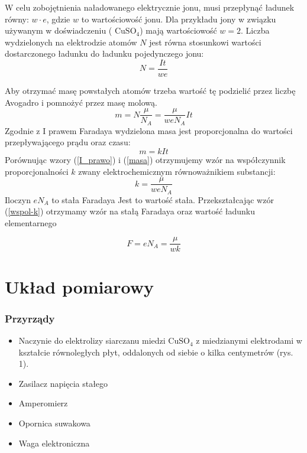 \documentclass [a4paper,11pt]{article}
\begin{document}
W celu zobojętnienia naładowanego elektrycznie jonu, musi przepłynąć ładunek równy: $ w \cdot e$, gdzie $w$ to wartościowość jonu. 
 Dla przykładu jony w związku używanym w doświadczeniu ( $\text{CuSO}_4$) mają wartościowość $w = 2$. 
Liczba wydzielonych na elektrodzie atomów $N$ jest równa stosunkowi wartości dostarczonego ładunku do ładunku pojedynczego jonu:
\begin{equation}
N = \frac{I t}{w e}
\end{equation}

Aby otrzymać masę powstałych atomów trzeba wartość tę podzielić przez liczbę Avogadro i pomnożyć przez masę molową.
\begin{equation}
m = N \frac{\mu}{N_A} = \frac{\mu}{ w e N_A} It
\label{masa}
\end{equation}
Zgodnie z I prawem Faradaya wydzielona masa jest proporcjonalna do wartości przepływającego prądu oraz czasu:
\begin{equation}
m = k I t
\label{I_prawo}
\end{equation}
Porównując wzory (\ref{I_prawo}) i (\ref{masa}) otrzymujemy wzór na współczynnik proporcjonalności $k$ zwany elektrochemicznym równoważnikiem substancji:
\begin{equation}
k = \frac{\mu}{w e  N_A}
\label{wspol-k}
\end{equation}
 Iloczyn $e N_A$ to stała Faradaya Jest to wartość stała. Przekształcając wzór (\ref{wspol-k}) otrzymamy wzór na stałą Faradaya oraz wartość ładunku elementarnego
 
  \begin{equation}
  F = e N_A =  \frac{\mu}{w k} 
  \label{stala_Faradaya_wzór}
  \end{equation}
 

\section{Układ pomiarowy}


\subsubsection*{Przyrządy}
\begin{itemize}
\item Naczynie do elektrolizy siarczanu miedzi $\text{CuSO}_4$ z miedzianymi elektrodami w kształcie
równoległych płyt, oddalonych od siebie o kilka centymetrów (rys. 1).
\item Zasilacz napięcia stałego
\item Amperomierz
\item Opornica suwakowa
\item Waga elektroniczna
\end{itemize}
\end{document}
